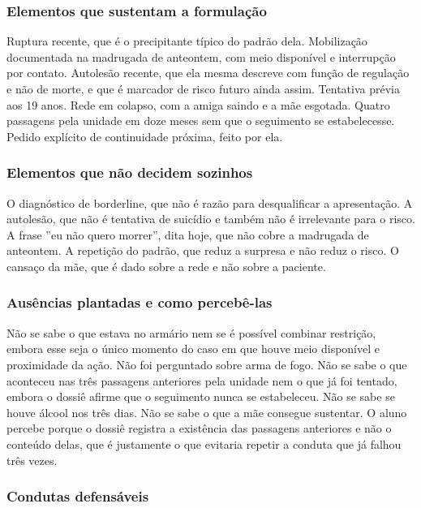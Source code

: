 \subsubsection*{Elementos que sustentam a formulação}

Ruptura recente, que é o precipitante típico do padrão dela. Mobilização documentada na madrugada de anteontem, com meio disponível e interrupção por contato. Autolesão recente, que ela mesma descreve com função de regulação e não de morte, e que é marcador de risco futuro ainda assim. Tentativa prévia aos 19 anos. Rede em colapso, com a amiga saindo e a mãe esgotada. Quatro passagens pela unidade em doze meses sem que o seguimento se estabelecesse. Pedido explícito de continuidade próxima, feito por ela.

\subsubsection*{Elementos que não decidem sozinhos}

O diagnóstico de borderline, que não é razão para desqualificar a apresentação. A autolesão, que não é tentativa de suicídio e também não é irrelevante para o risco. A frase ''eu não quero morrer'', dita hoje, que não cobre a madrugada de anteontem. A repetição do padrão, que reduz a surpresa e não reduz o risco. O cansaço da mãe, que é dado sobre a rede e não sobre a paciente.

\subsubsection*{Ausências plantadas e como percebê-las}

Não se sabe o que estava no armário nem se é possível combinar restrição, embora esse seja o único momento do caso em que houve meio disponível e proximidade da ação. Não foi perguntado sobre arma de fogo. Não se sabe o que aconteceu nas três passagens anteriores pela unidade nem o que já foi tentado, embora o dossiê afirme que o seguimento nunca se estabeleceu. Não se sabe se houve álcool nos três dias. Não se sabe o que a mãe consegue sustentar. O aluno percebe porque o dossiê registra a existência das passagens anteriores e não o conteúdo delas, que é justamente o que evitaria repetir a conduta que já falhou três vezes.

\subsubsection*{Condutas defensáveis}

